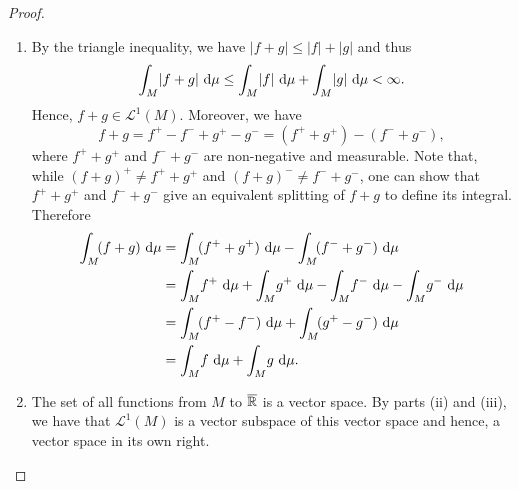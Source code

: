 \begin{proof}
\begin{enumerate}[label=(\roman*)]
\noindent Suppose $c \geq 0$. Then, $(c f)^+ = cf^+$ and $(c f)^- = c f^-$ and thus
\begin{align*}
  \int_M \!c f \, \d \mu
  &= \int_M \! (c f)^+ \, \d \mu -   \int_M \! (c f)^- \, \d \mu\\
  &= \int_M \! c f^+ \, \d \mu -   \int_M \! c f^- \, \d \mu\\
  &=  c\int_M \! f^+ \, \d \mu -c \int_M \! f^- \, \d \mu \\
  &=  c\int_M \! (f^+ -f^-)\, \d \mu  \\
  &= c\int_M \!  f \, \d \mu
\end{align*}
Now suppose $c = -1$. Then, $(- f)^+ = f^-$ and $(- f)^- = f^+$. Thus
\begin{align*}
  \int_M \! (-f) \, \d \mu
  &= \int_M \! (- f)^+ \, \d \mu -   \int_M \! (- f)^- \, \d \mu\\
  &= \int_M \! f^- \, \d \mu -   \int_M \!  f^+ \, \d \mu\\
  &= -\biggl( \int_M \! f^+ \, \d \mu - \int_M \! f^- \, \d \mu \biggr) \\
  &=  -\int_M \! (f^+ -f^-)\, \d \mu  \\
  &= -\int_M \!  f \, \d \mu.
\end{align*}
The case $c < 0$ follows by writing $c = (-1)(-c) $ and applying the above results.
\item By the triangle inequality, we have $|f+g| \leq | f| +| g|$ and thus
\begin{equation*}
\int_M \!  |f+g| \, \mathop{}\!\mathrm{d} \mu \leq \int_M \!  |f| \, \mathop{}\!\mathrm{d} \mu + \int_M \!  |g| \, \mathop{}\!\mathrm{d} \mu < \infty.
\end{equation*}
Hence, $f+g \in \mathscr{L}^1(M)$. Moreover, we have
\begin{equation*}
f+g = f^+ -f^- + g^+ -g^- = (f^++g^+)-(f^-+g^-),
\end{equation*}
where $f^++g^+$ and $f^-+g^-$ are non-negative and measurable. Note that, while $(f+g)^+\neq f^++g^+$ and $(f+g)^-\neq f^-+g^-$, one can show that $f^++g^+$ and $f^-+g^-$ give an equivalent splitting of $f+g$ to define its integral.
Therefore
\begin{align*}
  \int_M \! (f+g) \, \d \mu
  &= \int_M \!  (f^++g^+) \, \d \mu - \int_M \! (f^-+g^-) \, \d \mu\\
  &= \int_M \!  f^+ \, \d \mu + \int_M \!  g^+ \, \d \mu - \int_M \! f^- \, \d \mu - \int_M \! g^- \, \d \mu   \\
  &=  \int_M \! (f^+ -f^-)\, \d \mu  + \int_M \! (g^+ -g^-)\, \d \mu\\
  &= \int_M \!  f \, \d \mu + \int_M \!  g \, \d \mu.
\end{align*}
\item The set of all functions from $M$ to $\overline{\mathbb{R}}$ is a vector space. By parts (ii) and (iii), we have that $\mathscr{L}^1(M)$ is a vector subspace of this vector space and hence, a vector space in its own right. \qedhere
\end{enumerate}
\end{proof}

